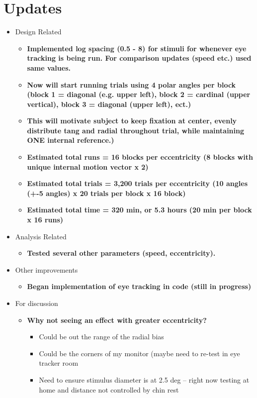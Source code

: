 \documentclass[11pt]{article} %
\begin{document}
\section{Updates} 
\begin{itemize}
\item Design Related
	\begin{itemize}
	\item \textbf{Implemented log spacing (0.5 - 8) for stimuli for whenever eye tracking is being run. For comparison updates (speed etc.) used same values.}
	\item \textbf{Now will start running trials using 4 polar angles per block (block 1 = diagonal (e.g. upper left), block 2 = cardinal (upper vertical), block 3 = diagonal (upper left), ect.)}
	\item \textbf{This will motivate subject to keep fixation at center, evenly distribute tang and radial throughout trial, while maintaining ONE internal reference.)}
	\item \textbf{Estimated total runs = 16 blocks per eccentricity (8 blocks with unique internal motion vector x 2)}
	\item \textbf{Estimated total trials = 3,200 trials per eccentricity (10 angles (+-5 angles) x 20 trials per block x 16 block)}
	\item \textbf{Estimated total time = 320 min, or 5.3 hours (20 min per block x 16 runs)}
	\end{itemize}
\item Analysis Related
	\begin{itemize}
	\item \textbf{Tested several other parameters (speed, eccentricity).}
	\end{itemize}
\item Other improvements
	\begin{itemize}
	\item \textbf{Began implementation of eye tracking in code (still in progress)}
	\end{itemize}
\item For discussion
	\begin{itemize}
	\item \textbf{Why not seeing an effect with greater eccentricity?}
		\begin{itemize}
			\item{Could be out the range of the radial bias}
			\item{Could be the corners of my monitor (maybe need to re-test in eye tracker room}
			\item{Need to ensure stimulus diameter is at 2.5 deg -- right now testing at home and distance not controlled by chin rest}

\end{itemize}
\end{itemize}
\end{itemize}
\end{document}
